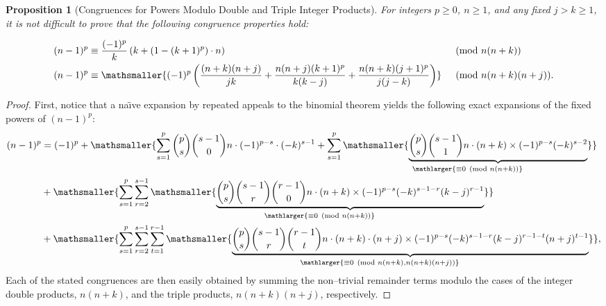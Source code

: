 \documentclass[12pt,reqno]{article}
\renewenvironment{subequations}{%
  \refstepcounter{equation}%
  \edef\theparentequation{\theequation}%
  \setcounter{parentequation}{\value{equation}}%
  \setcounter{equation}{0}%
  \def\theequation{\theparentequation.\alph{equation}}%
  \ignorespaces
}{%
  \setcounter{equation}{\value{parentequation}}%
  \ignorespacesafterend
}
\numberwithin{sfootnote}{section}
\numberwithin{equation}{section}
\theoremstyle{plain}
\newtheorem{prop}[theorem]{Proposition}
\theoremstyle{definition}
\theoremstyle{remark}
\newcommand{\undersetbrace}[2]{\ensuremath{\underset{\mathlarger{#1}}{\mathsmaller{\underbrace{#2}}}}}
\newcommand{\StartGroupingSubEquations}{\begin{subequations}}
\newcommand{\EndGroupingSubEquations}{\end{subequations}}
\begin{document}
\begin{prop}[Congruences for Powers Modulo Double and Triple Integer Products] 
For integers $p \geq 0$, $n \geq 1$, and any fixed $j > k \geq 1$, 
it is not difficult to prove that the 
following congruence properties hold: 
\StartGroupingSubEquations 
\label{eqn_CongruencesForPowsOfN_ModDblTripleIntProducts} 
\begin{align} 
(n-1)^{p} 
     & \equiv 
     \frac{(-1)^{p}}{k}\left(k + (1- (k+1)^{p}) \cdot n\right) 
     && \pmod{n(n+k)} \\ 
(n-1)^{p}     
     & \equiv 
     \mathsmaller{ 
     (-1)^{p} \left( 
     \frac{(n+k)(n+j)}{jk} + 
     \frac{n(n+j) (k+1)^{p}}{k(k-j)} + 
     \frac{n(n+k) (j+1)^{p}}{j(j-k)} 
     \right) 
     } 
     && \pmod{n(n+k)(n+j)}. 
\end{align} 
\EndGroupingSubEquations 
\end{prop} 
\begin{proof} 
First, notice that a na\"{\i}ve expansion by repeated appeals to the 
binomial theorem yields the following exact expansions of the 
fixed powers of $(n-1)^{p}$: 
{\smaller 
     \begin{align*} 
     (n-1)^{p} & = 
          (-1)^{p} + 
          \mathsmaller{ 
          \sum\limits_{s=1}^{p} \binom{p}{s} \binom{s-1}{0} 
          n \cdot (-1)^{p-s} \cdot (-k)^{s-1} + 
          \sum\limits_{s=1}^{p} 
          \undersetbrace{\equiv 0 \pmod{n(n+k)}}{ 
          \binom{p}{s} \binom{s-1}{1} 
          n \cdot (n+k) \times (-1)^{p-s} (-k)^{s-2} 
          } 
          } \\ 
          & + 
          \mathsmaller{ 
          \sum\limits_{s=1}^{p} \sum\limits_{r=2}^{s-1} 
          \undersetbrace{\equiv 0 \pmod{n(n+k)}}{ 
          \binom{p}{s} \binom{s-1}{r} \binom{r-1}{0} 
          n \cdot (n+k) \times 
          (-1)^{p-s} (-k)^{s-1-r} (k-j)^{r-1} 
          } 
          } \\ 
          & + 
          \mathsmaller{ 
          \sum\limits_{s=1}^{p} \sum\limits_{r=2}^{s-1} \sum\limits_{t=1}^{r-1} 
          \undersetbrace{\equiv 0 \pmod{n(n+k),n(n+k)(n+j)}}{ 
          \binom{p}{s} \binom{s-1}{r} \binom{r-1}{t} 
          n \cdot (n+k) \cdot (n+j) \times 
          (-1)^{p-s} (-k)^{s-1-r} (k-j)^{r-1-t} (n+j)^{t-1} 
          } 
          }, 
     \end{align*}}
Each of the stated congruences are then easily obtained by summing the 
non--trivial remainder terms modulo the cases of the 
integer double products, $n(n+k)$, and the 
triple products, $n(n+k)(n+j)$, respectively. 
\end{proof} 
\end{document}
